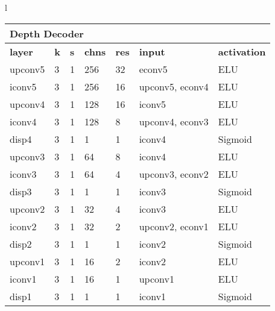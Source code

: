 \begin{tabular}[t]{l}

\begin{tabular}[t]{|l|l|l|l|l|l|l|}
\hline
\multicolumn{7}{|l|}{\textbf{Depth Decoder}} \\
\hline
\textbf{layer} & \textbf{k} & \textbf{s} & \textbf{chns} & \textbf{res} & \textbf{input}   & \textbf{activation}    \\ \hline
upconv5       & 3      & 1      & 256      & 32    & econv5                     & ELU \cite{elus} \\
iconv5        & 3      & 1      & 256      & 16    & upconv5, econv4 & ELU \\ \hline

upconv4       & 3      & 1      & 128      & 16    & iconv5                    & ELU \\
iconv4        & 3      & 1      & 128      & 8     & upconv4, econv3 & ELU \\
disp4         & 3      & 1      & 1        & 1     & iconv4                    & Sigmoid \\ \hline

upconv3       & 3      & 1      & 64       & 8     & iconv4                    & ELU \\
iconv3        & 3      & 1      & 64       & 4     & upconv3, econv2 & ELU \\
disp3         & 3      & 1      & 1        & 1     & iconv3                   & Sigmoid  \\ \hline

upconv2       & 3      & 1      & 32       & 4     & iconv3                    & ELU \\
iconv2        & 3      & 1      & 32       & 2     & upconv2, econv1 & ELU \\
disp2         & 3      & 1      & 1        & 1     & iconv2                    & Sigmoid \\ \hline

upconv1       & 3      & 1      & 16       & 2     & iconv2                    & ELU \\
iconv1        & 3      & 1      & 16       & 1     & upconv1         & ELU \\
disp1         & 3      & 1      & 1        & 1     & iconv1                    & Sigmoid \\ \hline
\end{tabular}  \\


\begin{tabular}[t]{|l|l|l|l|l|l|l|}


\end{tabular}
\end{tabular}
